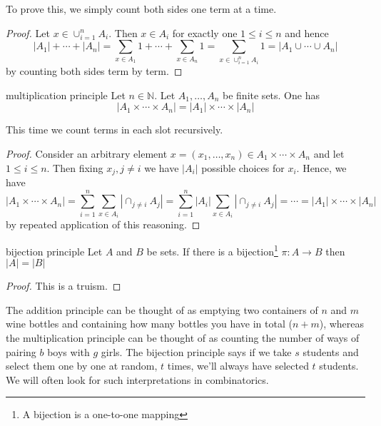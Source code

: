 \documentclass{article}
\begin{document}
To prove this, we simply count both sides one term at a time.

\begin{proof}
    Let $x \in \cup_{i=1}^n A_i$. Then $x \in A_i$ for exactly one $1 \leq i \leq n$ and hence 
    \[|A_1| + \cdots + |A_n| =\sum_{x \in A_1}1 + \cdots + \sum_{x \in A_n}1 = \sum_{x \in \cup_{i=1}^n A_i}1 = |A_1 \cup \cdots \cup A_n|\] 
    by counting both sides term by term.
\end{proof}

\begin{theorem}[]{multiplication principle}
    Let $n \in \mathbb{N}$. Let $A_1, \dots, A_n$ be finite sets. One has
    \[|A_1 \times \cdots \times A_n| = |A_1| \times \cdots \times |A_n|\]
\end{theorem}

This time we count terms in each slot recursively.

\begin{proof}
    Consider an arbitrary element $x = (x_1, \dots, x_n) \in A_1 \times \cdots \times A_n$ and let $1 \leq i \leq n$. Then fixing $x_j, j \neq i$
    we have $|A_i|$ possible choices for $x_i$. Hence, we have 
    \[|A_1 \times \cdots \times A_n| = \sum_{i=1}^n\sum_{x \in A_i}\left|\cap_{j \neq i}A_j\right| 
    = \sum_{i=1}^n |A_i|\sum_{x \in A_i}\left|\cap_{j \neq i}A_j\right| = \cdots = |A_1| \times \cdots \times |A_n|\]
    by repeated application of this reasoning.
\end{proof}

\begin{theorem}[]{bijection principle}
    Let $A$ and $B$ be sets. If there is a bijection\footnote{A bijection is a one-to-one mapping} $\pi: A \to B$ then $|A| = |B|$
\end{theorem}

\begin{proof}
    This is a truism. 
\end{proof}

The addition principle can be thought of as emptying two containers of $n$ and $m$ wine bottles and containing how many bottles you have 
in total ($n+m$), whereas the multiplication principle can be thought of as counting the number of ways of pairing $b$ boys with $g$ girls. 
The bijection principle says if we take $s$ students and select them one by one at random, $t$ times, we'll always have selected $t$ students. 
We will often look for such interpretations in combinatorics. \\
\end{document}
